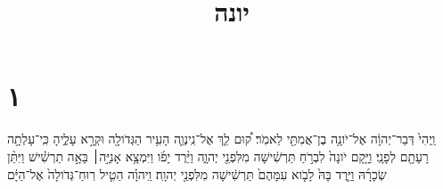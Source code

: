 \documentclass{openreader}
\title{יונה}
\date{}
\begin{document}
\maketitle
\raggedbottom 
\fontsize{16pt}{24pt}\selectfont
\section*{۱}
וַֽיְהִי֙ דְּבַר־יְהוָ֔ה אֶל־יֹונָ֥ה בֶן־אֲמִתַּ֖י לֵאמֹֽר׃ ק֠וּם לֵ֧ךְ אֶל־נִֽינְוֵ֛ה הָעִ֥יר הַגְּדֹולָ֖ה וּקְרָ֣א עָלֶ֑יהָ כִּֽי־עָלְתָ֥ה רָעָתָ֖ם לְפָנָֽי׃ וַיָּ֤קָם יֹונָה֙ לִבְרֹ֣חַ תַּרְשִׁ֔ישָׁה מִלִּפְנֵ֖י יְהוָ֑ה וַיֵּ֨רֶד יָפֹ֜ו וַיִּמְצָ֥א אָנִיָּ֣ה׀ בָּאָ֣ה תַרְשִׁ֗ישׁ וַיִּתֵּ֨ן שְׂכָרָ֜הּ וַיֵּ֤רֶד בָּהּ֙ לָבֹ֤וא עִמָּהֶם֙ תַּרְשִׁ֔ישָׁה מִלִּפְנֵ֖י יְהוָֽה׃ וַֽיהוָ֗ה הֵטִ֤יל רֽוּחַ־גְּדֹולָה֙ אֶל־הַיָּ֔ם 
\end{document}
